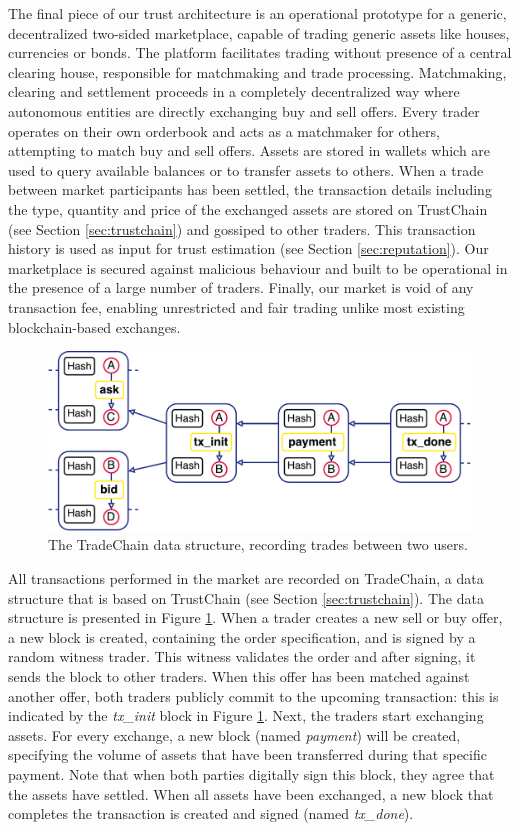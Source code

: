 \documentclass[USenglish]{article}
\begin{document}
The final piece of our trust architecture is an operational prototype for a generic, decentralized two-sided marketplace, capable of trading generic assets like houses, currencies or bonds.
The platform facilitates trading without presence of a central clearing house, responsible for matchmaking and trade processing.
Matchmaking, clearing and settlement proceeds in a completely decentralized way where autonomous entities are directly exchanging buy and sell offers.
Every trader operates on their own orderbook and acts as a matchmaker for others, attempting to match buy and sell offers.
Assets are stored in wallets which are used to query available balances or to transfer assets to others.
When a trade between market participants has been settled, the transaction details including the type, quantity and price of the exchanged assets are stored on TrustChain (see Section \ref{sec:trustchain}) and gossiped to other traders.
This transaction history is used as input for trust estimation (see Section \ref{sec:reputation}).
Our marketplace is secured against malicious behaviour and built to be operational in the presence of a large number of traders.
Finally, our market is void of any transaction fee, enabling unrestricted and fair trading unlike most existing blockchain-based exchanges.

\begin{figure}[t]
	\centering
	\includegraphics[width=.9\columnwidth]{assets/tradechain}
	\caption{The TradeChain data structure, recording trades between two users.}
	\label{fig:tradechain}
\end{figure}

All transactions performed in the market are recorded on TradeChain, a data structure that is based on TrustChain (see Section \ref{sec:trustchain}).
The data structure is presented in Figure \ref{fig:tradechain}.
When a trader creates a new sell or buy offer, a new block is created, containing the order specification, and is signed by a random witness trader.
This witness validates the order and after signing, it sends the block to other traders.
When this offer has been matched against another offer, both traders publicly commit to the upcoming transaction: this is indicated by the \emph{tx\_init} block in Figure \ref{fig:tradechain}.
Next, the traders start exchanging assets.
For every exchange, a new block (named \emph{payment}) will be created, specifying the volume of assets that have been transferred during that specific payment.
Note that when both parties digitally sign this block, they agree that the assets have settled.
When all assets have been exchanged, a new block that completes the transaction is created and signed (named \emph{tx\_done}).
\end{document}

